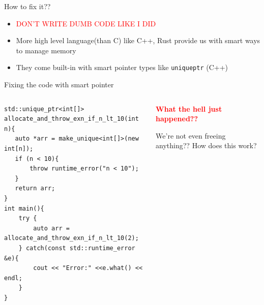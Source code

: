 \documentclass[
  10pt,
  ignorenonframetext,
]{beamer}
\begin{document}
\begin{frame}{How to fix it??}
\protect\hypertarget{how-to-fix-it}{}
\begin{itemize}
\item
  \textcolor{red}{DON'T WRITE DUMB CODE LIKE I DID}
\item
  More high level language(than C) like C++, Rust
  provide us with smart ways to manage memory
\item
  They come built-in with smart pointer types like
  \texttt{unique\textunderscore ptr} (C++)
\end{itemize}
\end{frame}

\begin{frame}[fragile]{Fixing the code with smart
pointer}
\protect\hypertarget{fixing-the-code-with-smart-pointer}{}
\scriptsize

\begin{columns}[T]
\begin{column}{0.48\textwidth}
\begin{verbatim}
std::unique_ptr<int[]> allocate_and_throw_exn_if_n_lt_10(int n){
   auto *arr = make_unique<int[]>(new int[n]);
   if (n < 10){
       throw runtime_error("n < 10");
   }
   return arr;
}
int main(){
    try {
        auto arr = allocate_and_throw_exn_if_n_lt_10(2);
    } catch(const std::runtime_error &e){
        cout << "Error:" <<e.what() << endl;
    }
}
\end{verbatim}

\normalsize

\pause
\end{column}

\begin{column}{0.48\textwidth}
\vspace{90pt}

\begin{center}

\large
\textbf{\textcolor{red}{What the hell just happened??}}

\normalsize

We're not even freeing anything?? How does this work?

\end{center}
\end{column}
\end{columns}
\end{frame}
\end{document}
